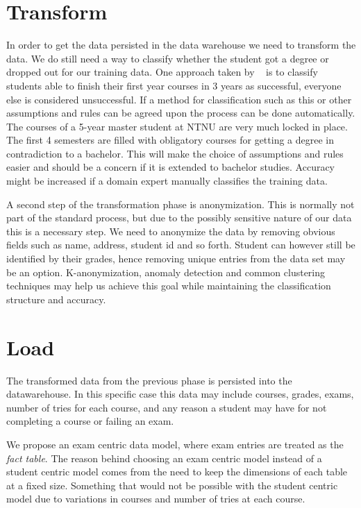 \section{Transform}
In order to get the data persisted in the data warehouse we need to transform the data.
We do still need a way to classify whether the student got a degree or dropped out for our training data.
One approach taken by ~\cite{7} is to classify students able to finish their first year courses in 3 years as successful,
everyone else is considered unsuccessful.
If a method for classification such as this or other assumptions and rules can be agreed upon the process can be done automatically.
The courses of a 5-year master student at NTNU are very much locked in place.
The first 4 semesters are filled with obligatory courses for getting a degree in contradiction to a bachelor.
This will make the choice of assumptions and rules easier and should be a concern if it is extended to bachelor studies.
Accuracy might be increased if a domain expert manually classifies the training data.

\bigskip\noindent
A second step of the transformation phase is anonymization. 
This is normally not part of the standard process, but due to the possibly sensitive nature of our data this is a necessary step.
We need to anonymize the data by removing obvious fields such as name, address, student id and so forth. 
Student can however still be identified by their grades, hence removing unique entries from the data set may be an option.
K-anonymization, anomaly detection and common clustering techniques may help us achieve this goal while maintaining the classification structure and accuracy.

\section{Load}
The transformed data from the previous phase is persisted into the datawarehouse. 
In this specific case this data may include courses, grades, exams, number of tries for each course, 
and any reason a student may have for not completing a course or failing an exam.

\bigskip\noindent
We propose an exam centric data model, where exam entries are treated as the \textit{fact table}. 
The reason behind choosing an exam centric model instead of a student centric model comes from the
need to keep the dimensions of each table at a fixed size. Something that would not be possible 
with the student centric model due to variations in courses and number of tries at each course.

